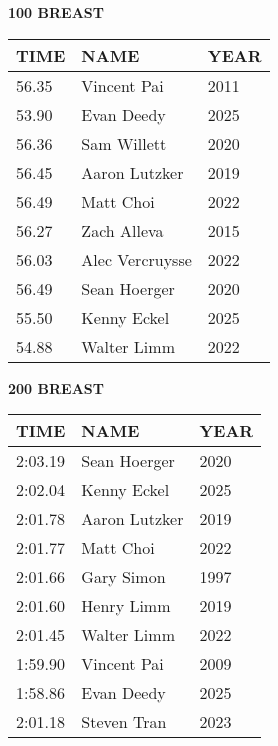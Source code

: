 \begin{table}[H]
\centering
\begin{minipage}[t]{0.48\textwidth}
\centering
\textbf{100 BREAST}\\[0.1cm]
\begin{tabular}{@{}p{1.8cm}p{2.8cm}p{1.2cm}@{}}
\hline
    \textbf{TIME} & \textbf{NAME} & \textbf{YEAR} \\
\hline
    56.35 & Vincent Pai & 2011 \\
    53.90 & Evan Deedy & 2025 \\
    56.36 & Sam Willett & 2020 \\
    56.45 & Aaron Lutzker & 2019 \\
    56.49 & Matt Choi & 2022 \\
    56.27 & Zach Alleva & 2015 \\
    56.03 & Alec Vercruysse & 2022 \\
    56.49 & Sean Hoerger & 2020 \\
    55.50 & Kenny Eckel & 2025 \\
    54.88 & Walter Limm & 2022 \\
\hline
\end{tabular}
\end{minipage}\hfill
\begin{minipage}[t]{0.48\textwidth}
\centering
\textbf{200 BREAST}\\[0.1cm]
\begin{tabular}{@{}p{1.8cm}p{2.8cm}p{1.2cm}@{}}
\hline
    \textbf{TIME} & \textbf{NAME} & \textbf{YEAR} \\
\hline
    2:03.19 & Sean Hoerger & 2020 \\
    2:02.04 & Kenny Eckel & 2025 \\
    2:01.78 & Aaron Lutzker & 2019 \\
    2:01.77 & Matt Choi & 2022 \\
    2:01.66 & Gary Simon & 1997 \\
    2:01.60 & Henry Limm & 2019 \\
    2:01.45 & Walter Limm & 2022 \\
    1:59.90 & Vincent Pai & 2009 \\
    1:58.86 & Evan Deedy & 2025 \\
    2:01.18 & Steven Tran & 2023 \\
\hline
\end{tabular}
\end{minipage}
\end{table}

